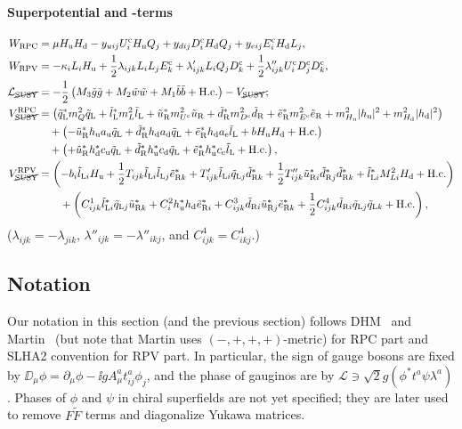 \documentclass[CheatSheet]{subfiles}
\begin{document}
\paragraph{Superpotential and -terms}
\begin{align}
 W\w{RPC} &= \mu\Hu\Hd
           - \yu[ij] U^\cc_i\Hu Q_j
           + \yd[ij] D^\cc_i\Hd Q_j
           + \ye[ij] E^\cc_i\Hd L_j,\\
 W\w{RPV} &= -\kappa_i L_i\Hu
           + \frac12 \lambda  _{ijk} L_i L_j E^\cc_k
           +         \lambda' _{ijk} L_i Q_j D^\cc_k
           + \frac12 \lambda''_{ijk} U^\cc_i D^\cc_j D^\cc_k,
\\
\mathcal L_{\text{\cancel{SUSY}}}&=
- \frac12\left(M_3\tig\tig+M_2\tiw\tiw+M_1\tib\tib+\text{H.c.}\right)
-V_{\text{\cancel{SUSY}}};\\
V^{\mathrm{RPC}}_{\text{\cancel{SUSY}}}&=
\left(\tqL^*m_Q^2\tqL+\tlL^*m_L^2\tlL+\tuR^* m_{U^\cc}^2\tuR + \tdR^* m_{D^\cc}^2\tdR + \teR^* m_{E^\cc}^2\teR
       +m^2_{\Hu}|\hu|^2 + m^2_{\Hd}|\hd|^2\right)
\notag\\&\quad
       +\left(-\tuR^*\hu {a\w u}\tqL + \tdR^* \hd {a\w d} \tqL+ \teR^* \hd {a\w e} \tlL + b\Hu\Hd+\text{H.c.}\right)
\notag\\&\quad
       +\left(+\tuR^*\hd^*{c\w u}\tqL+\tdR^* \hu^*{c\w d}\tqL+\teR^*\hu^*{c\w e}\tlL+\text{H.c.}\right),
\\
V^{\mathrm{RPV}}_{\text{\cancel{SUSY}}}&=
    \left(-b_i\tlL[i]\Hu +\frac12T_{ijk}\tlL[i]\tlL[j]\teR[k]^*+T'_{ijk}\tlL[i]\tqL[j]\tdR[k]^*
             +\frac12T''_{ijk}\tuR[i]^*\tdR[j]^*\tdR[k]^*
    +\tlL[i]^*M^2_{Li}\Hd+\text{H.c.}\right)
\notag\\&\qquad
   + \left(C^1_{ijk}\tlL[i]^*\tqL[j]\tuR[k]^* + C^2_i\hu^*\hd\teR[i]^* + C^3_{ijk}\tdR[i]\tuR[j]^*\teR[k]^*+\frac12C^4_{ijk}\tdR[i]\tqL[j]\tqL[k]+\text{H.c.}\right),
\end{align}
($\lambda_{ijk}=-\lambda_{jik}$, $\lambda''_{ijk}=-\lambda''_{ikj}$, and
$C^4_{ijk}=C^4_{ikj}$.)



\clearpage

\detailstyle



\subsection{Notation}
Our notation in this section (and the previous section)  follows DHM~\cite[PhysRept]{0812.1594} and Martin~\cite[v7]{hep-ph9709356} (but note that Martin uses $(-,+,+,+)$-metric) for RPC part and SLHA2 convention for RPV part.
In particular, the sign of gauge bosons are fixed by $\DD_\mu\phi = \partial_\mu\phi - \ii g A_\mu^a t^a_{ij}\phi_j$, and the phase of gauginos are by $\mathcal L\ni \sqrt2 g (\phi^*t^a\psi\lambda^a)$.
Phases of $\phi$ and $\psi$ in chiral superfields are not yet specified; they are later used to remove $F\tilde F$ terms and diagonalize Yukawa matrices.
\end{document}
